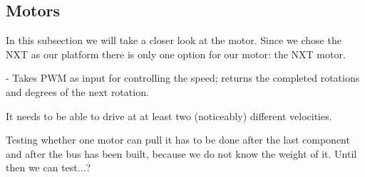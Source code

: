 \subsection{Motors} \label{analysisMotors}

In this subsection we will take a closer look at the motor. Since we chose the NXT as our platform there is only one option for our motor: the NXT motor.

- Takes PWM as input for controlling the speed; returns the completed rotations and degrees of the next rotation.

It needs to be able to drive at at least two (noticeably) different velocities.

Testing whether one motor can pull it has to be done after the last component and after the bus has been built, because we do not know the weight of it. 
Until then we can test...?

